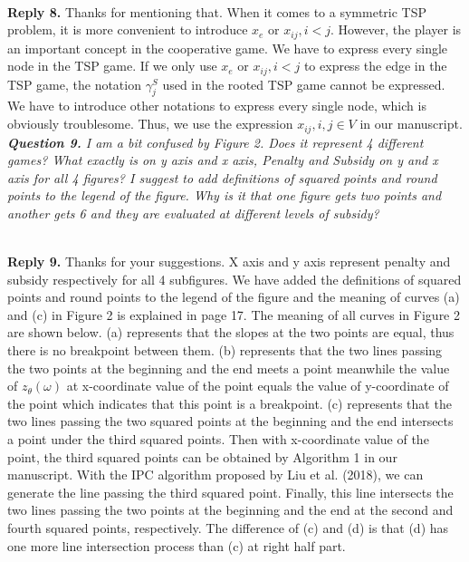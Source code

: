 \documentclass[11pt]{article}
\begin{document}
\\[2mm]
\noindent \textbf{Reply 8.}
Thanks for mentioning that.
When it comes to a symmetric TSP problem, it is more convenient to introduce $x_e$ or $x_{ij}, i<j$.
However, the player is an important concept in the cooperative game.
We have to express every single node in the TSP game.
If we only use $x_e$ or $x_{ij}, i<j$ to express the edge in the TSP game, the notation $\gamma^{S}_j$ used in the rooted TSP game cannot be expressed. We have to introduce other notations to express every single node, which is obviously troublesome.
Thus, we use the expression $x_{ij}, i,j \in V$ in our manuscript.
\\[4mm]
\noindent \textit{\textbf{Question 9.}
I am a bit confused by Figure 2. Does it represent 4 different games? What exactly is on y axis and x axis, Penalty and Subsidy on y and x axis for all 4 figures? I suggest to add definitions of squared points and round points to the legend of the figure. Why is it that one figure gets two points and another gets 6 and they are evaluated at different levels of subsidy?}

\\[2mm]
\noindent \textbf{Reply 9.}
Thanks for your suggestions.
X axis and y axis represent penalty and subsidy respectively for all 4 subfigures.
We have added the definitions of squared points and round points to the legend of the figure and the meaning of curves (a) and (c) in Figure 2 is explained in page 17.
The meaning of all curves in Figure 2 are shown below. (a) represents that the slopes at the two points are equal, thus there is no breakpoint between them. (b) represents that the two lines passing the two points at the beginning and the end meets a point meanwhile the value of $z_\theta(\omega)$ at x-coordinate value of the point equals the value of y-coordinate of the point which indicates that this point is a breakpoint. (c) represents that the two lines passing the two squared points at the beginning and the end intersects a point under the third squared points. Then with x-coordinate value of the point, the third squared points can be obtained by Algorithm 1 in our manuscript. With the IPC algorithm proposed by Liu et al. (2018), we can generate the line passing the third squared point. Finally, this line intersects the two lines passing the two points at the beginning and the end at the second and fourth squared points, respectively.
The difference of (c) and (d) is that (d) has one more line intersection process than (c) at right half part.
\end{document}
